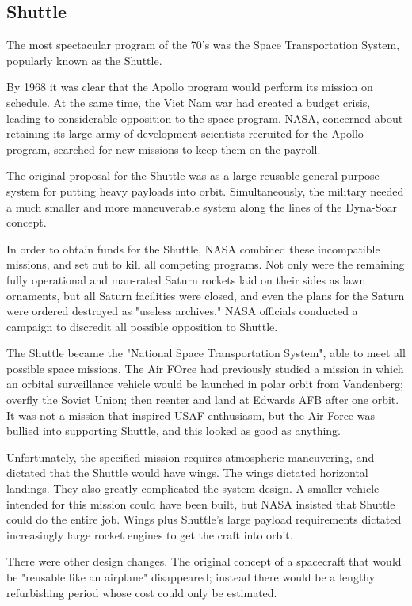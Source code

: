 \subsection{Shuttle}
The most spectacular program of the 70's was the Space Transportation System, popularly known as the Shuttle.

By 1968 it was clear that the Apollo program would perform its mission on schedule. At the same time, the Viet Nam war had created a budget crisis, leading to considerable opposition to the space program. NASA, concerned about retaining its large army of development scientists recruited for the Apollo program, searched for new missions to keep them on the payroll.

The original proposal for the Shuttle was as a large reusable general purpose system for putting heavy payloads into orbit. Simultaneously, the military needed a much smaller and more maneuverable system along the lines of the Dyna-Soar concept.

In order to obtain funds for the Shuttle, NASA combined these incompatible missions, and set out to kill all competing programs. Not only were the remaining fully operational and man-rated Saturn rockets laid on their sides as lawn ornaments, but all Saturn facilities were closed, and even the plans for the Saturn were ordered destroyed as "useless archives." NASA officials conducted a campaign to discredit all possible opposition to Shuttle.

The Shuttle became the "National Space Transportation System", able to meet all possible space missions. The Air FOrce had previously studied a mission in which an orbital surveillance vehicle would be launched in polar orbit from Vandenberg; overfly the Soviet Union; then reenter and land at Edwards AFB after one orbit. It was not a mission that inspired USAF enthusiasm, but the Air Force was bullied into supporting Shuttle, and this looked as good as anything.

Unfortunately, the specified mission requires atmospheric maneuvering, and dictated that the Shuttle would have wings. The wings dictated horizontal landings. They also greatly complicated the system design. A smaller vehicle intended for this mission could have been built, but NASA insisted that Shuttle could do the entire job. Wings plus Shuttle's large payload requirements dictated increasingly large rocket engines to get the craft into orbit.

There were other design changes. The original concept of a spacecraft that would be "reusable like an airplane" disappeared; instead there would be a lengthy refurbishing period whose cost could only be estimated.

